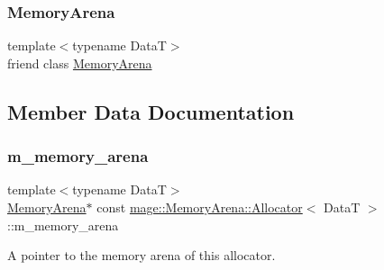 \subsubsection{\texorpdfstring{Memory\+Arena}{MemoryArena}}
{\footnotesize\ttfamily template$<$typename DataT$>$ \\
friend class \hyperlink{classmage_1_1_memory_arena}{Memory\+Arena}\hspace{0.3cm}{\ttfamily [friend]}}



\subsection{Member Data Documentation}
\hypertarget{structmage_1_1_memory_arena_1_1_allocator_a821cb29f5f5c5d1581f87e9dac143d53}{}\label{structmage_1_1_memory_arena_1_1_allocator_a821cb29f5f5c5d1581f87e9dac143d53} 
\subsubsection{\texorpdfstring{m\+\_\+memory\+\_\+arena}{m\_memory\_arena}}
{\footnotesize\ttfamily template$<$typename DataT$>$ \\
\hyperlink{classmage_1_1_memory_arena}{Memory\+Arena}$\ast$ const \hyperlink{structmage_1_1_memory_arena_1_1_allocator}{mage\+::\+Memory\+Arena\+::\+Allocator}$<$ DataT $>$\+::m\+\_\+memory\+\_\+arena\hspace{0.3cm}{\ttfamily [private]}}

A pointer to the memory arena of this allocator. 